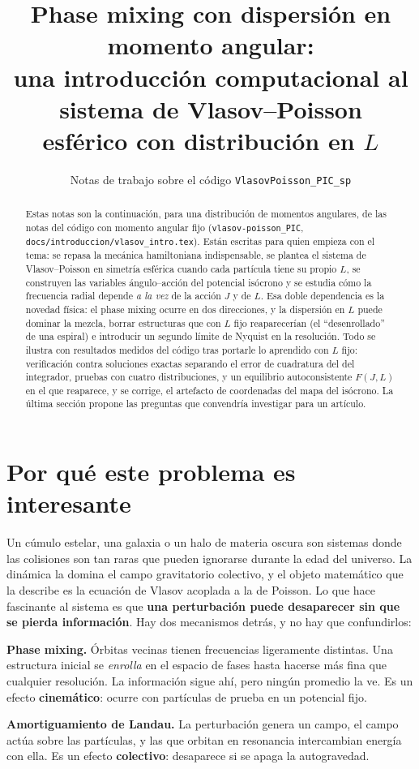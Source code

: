 \documentclass[11pt,a4paper]{article}
\title{\bfseries Phase mixing con dispersión en momento angular:\\
       una introducción computacional al sistema de Vlasov--Poisson\\
       esférico con distribución en $L$}
\author{Notas de trabajo sobre el código \texttt{VlasovPoisson\_PIC\_sp}}
\date{}
\begin{document}
\maketitle

\begin{abstract}
\noindent
Estas notas son la continuación, para una distribución de momentos angulares, de las
notas del código con momento angular fijo (\texttt{vlasov-poisson\_PIC},
\texttt{docs/introduccion/vlasov\_intro.tex}). Están escritas para quien empieza con el
tema: se repasa la mecánica hamiltoniana indispensable, se plantea el sistema de
Vlasov--Poisson en simetría esférica cuando cada partícula tiene su propio $L$, se
construyen las variables ángulo--acción del potencial isócrono y se estudia cómo la
frecuencia radial depende \emph{a la vez} de la acción $J$ y de $L$. Esa doble
dependencia es la novedad física: el phase mixing ocurre en dos direcciones, y la
dispersión en $L$ puede dominar la mezcla, borrar estructuras que con $L$ fijo
reaparecerían (el ``desenrollado'' de una espiral) e introducir un segundo límite de
Nyquist en la resolución. Todo se ilustra con resultados medidos del código tras
portarle lo aprendido con $L$ fijo: verificación contra soluciones exactas separando el
error de cuadratura del del integrador, pruebas con cuatro distribuciones, y un
equilibrio autoconsistente $F(J,L)$ en el que reaparece, y se corrige, el artefacto de
coordenadas del mapa del isócrono. La última sección propone las preguntas que
convendría investigar para un artículo.
\end{abstract}

\tableofcontents
\bigskip

\section{Por qué este problema es interesante}

Un cúmulo estelar, una galaxia o un halo de materia oscura son sistemas donde las
colisiones son tan raras que pueden ignorarse durante la edad del universo. La dinámica
la domina el campo gravitatorio colectivo, y el objeto matemático que la describe es la
ecuación de Vlasov acoplada a la de Poisson. Lo que hace fascinante al sistema es que
\textbf{una perturbación puede desaparecer sin que se pierda información}. Hay dos
mecanismos detrás, y no hay que confundirlos:

\begin{idea}
\textbf{Phase mixing.} Órbitas vecinas tienen frecuencias ligeramente distintas. Una
estructura inicial se \emph{enrolla} en el espacio de fases hasta hacerse más fina que
cualquier resolución. La información sigue ahí, pero ningún promedio la ve. Es un efecto
\textbf{cinemático}: ocurre con partículas de prueba en un potencial fijo.

\medskip
\textbf{Amortiguamiento de Landau.} La perturbación genera un campo, el campo actúa sobre
las partículas, y las que orbitan en resonancia intercambian energía con ella. Es un
efecto \textbf{colectivo}: desaparece si se apaga la autogravedad.
\end{idea}
\end{document}
